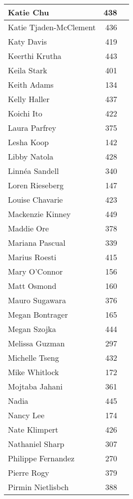 \documentclass[]{article}
\begin{document}
\begin{longtable}{lrl}
   \hline
Katie Chu & 438 &  \\ 
   \hline
Katie Tjaden-McClement & 436 &  \\ 
   \hline
Katy Davis & 419 &  \\ 
   \hline
Keerthi Krutha & 443 &  \\ 
   \hline
Keila Stark & 401 &  \\ 
   \hline
Keith Adams & 134 &  \\ 
   \hline
Kelly Haller & 437 &  \\ 
   \hline
Koichi Ito & 422 &  \\ 
   \hline
Laura Parfrey & 375 &  \\ 
   \hline
Lesha Koop & 142 &  \\ 
   \hline
Libby Natola & 428 &  \\ 
   \hline
Linn\'ea Sandell & 340 &  \\ 
   \hline
Loren Rieseberg & 147 &  \\ 
   \hline
Louise Chavarie & 423 &  \\ 
   \hline
Mackenzie Kinney & 449 &  \\ 
   \hline
Maddie Ore & 378 &  \\ 
   \hline
Mariana Pascual & 339 &  \\ 
   \hline
Marius Roesti & 415 &  \\ 
   \hline
Mary O'Connor & 156 &  \\ 
   \hline
Matt Osmond & 160 &  \\ 
   \hline
Mauro Sugawara & 376 &  \\ 
   \hline
Megan Bontrager & 165 &  \\ 
   \hline
Megan Szojka & 444 &  \\ 
   \hline
Melissa Guzman & 297 &  \\ 
   \hline
Michelle Tseng & 432 &  \\ 
   \hline
Mike Whitlock & 172 &  \\ 
   \hline
Mojtaba Jahani & 361 &  \\ 
   \hline
Nadia & 445 &  \\ 
   \hline
Nancy Lee & 174 &  \\ 
   \hline
Nate Klimpert & 426 &  \\ 
   \hline
Nathaniel Sharp & 307 &  \\ 
   \hline
Philippe Fernandez & 270 &  \\ 
   \hline
Pierre Rogy & 379 &  \\ 
   \hline
Pirmin Nietlisbch & 388 &  \\ 

\end{longtable}
\end{document}
